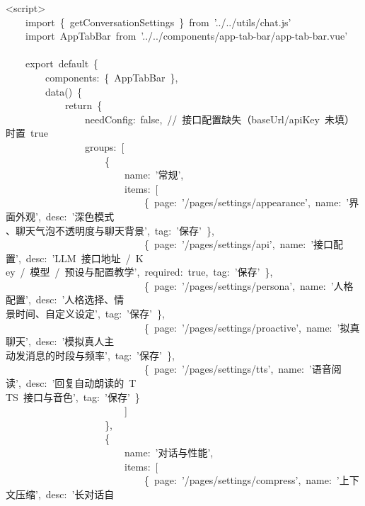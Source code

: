 \documentclass[a4paper,10pt]{article}
\begin{document}
{\ttfamily\footnotesize\raggedright
<script>\\
~~~~import~\{~getConversationSettings~\}~from~'../../utils/chat.js'\\
~~~~import~AppTabBar~from~'../../components/app-tab-bar/app-tab-bar.vue'\\
\mbox{}\\
~~~~export~default~\{\\
~~~~~~~~components:~\{~AppTabBar~\},\\
~~~~~~~~data()~\{\\
~~~~~~~~~~~~return~\{\\
~~~~~~~~~~~~~~~~needConfig:~false,~//~接口配置缺失（baseUrl/apiKey~未填）时置~true\\
~~~~~~~~~~~~~~~~groups:~[\\
~~~~~~~~~~~~~~~~~~~~\{\\
~~~~~~~~~~~~~~~~~~~~~~~~name:~'常规',\\
~~~~~~~~~~~~~~~~~~~~~~~~items:~[\\
~~~~~~~~~~~~~~~~~~~~~~~~~~~~\{~page:~'/pages/settings/appearance',~name:~'界面外观',~desc:~'深色模式\\
、聊天气泡不透明度与聊天背景',~tag:~'保存'~\},\\
~~~~~~~~~~~~~~~~~~~~~~~~~~~~\{~page:~'/pages/settings/api',~name:~'接口配置',~desc:~'LLM~接口地址~/~K\\
ey~/~模型~/~预设与配置教学',~required:~true,~tag:~'保存'~\},\\
~~~~~~~~~~~~~~~~~~~~~~~~~~~~\{~page:~'/pages/settings/persona',~name:~'人格配置',~desc:~'人格选择、情\\
景时间、自定义设定',~tag:~'保存'~\},\\
~~~~~~~~~~~~~~~~~~~~~~~~~~~~\{~page:~'/pages/settings/proactive',~name:~'拟真聊天',~desc:~'模拟真人主\\
动发消息的时段与频率',~tag:~'保存'~\},\\
~~~~~~~~~~~~~~~~~~~~~~~~~~~~\{~page:~'/pages/settings/tts',~name:~'语音阅读',~desc:~'回复自动朗读的~T\\
TS~接口与音色',~tag:~'保存'~\}\\
~~~~~~~~~~~~~~~~~~~~~~~~]\\
~~~~~~~~~~~~~~~~~~~~\},\\
~~~~~~~~~~~~~~~~~~~~\{\\
~~~~~~~~~~~~~~~~~~~~~~~~name:~'对话与性能',\\
~~~~~~~~~~~~~~~~~~~~~~~~items:~[\\
~~~~~~~~~~~~~~~~~~~~~~~~~~~~\{~page:~'/pages/settings/compress',~name:~'上下文压缩',~desc:~'长对话自\\
}
\end{document}
